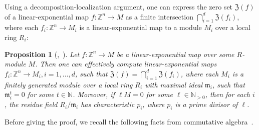 \documentclass[letterpaper, 11pt, thm-restate]{article}
\numberwithin{equation}{section}
\newcommand{\Z}{\mathbb{Z}}
\newcommand{\N}{\mathbb{N}}
\newcommand{\mZ}{\mathfrak{Z}}
\newcommand{\frm}{\mathfrak{m}}
\newtheorem{proposition}[theorem]{Proposition}
\theoremstyle{definition}
\theoremstyle{definition}
\theoremstyle{definition}
\begin{document}
Using a decomposition-localization argument, one can express the zero set $\mZ(f)$ of a linear-exponential map $f \colon \Z^n\rightarrow M$ as a finite intersection $\bigcap_{i = 1}^d \mZ(f_i)$, where each $f_i \colon \Z^n\rightarrow M_i$ is a linear-exponential map to a module $M_i$ over a local ring $R_i$:

\begin{proposition}[{\cite[Section~9]{derksen2007skolem},~\cite[Section~3.2]{dong2025s}}]\label{prop:decompose_localize}
    Let $f \colon \Z^n\rightarrow M$ be a linear-exponential map over some $R$-module $M$.
    Then one can effectively compute linear-exponential maps $f_i:\Z^n\rightarrow M_i, i = 1, \ldots, d$, such that $\mZ(f) = \bigcap_{i = 1}^d \mZ(f_i)$, where each $M_i$ is a finitely generated module over a local ring $R_i$ with maximal ideal $\frm_i$, such that $\frm_i^t = 0$ for some $t \in \N$.
    Moreover, if $\ell M = 0$ for some $\ell \in \N_{>0}$, then for each $i$, the residue field $R_i/\frm_i$ has characteristic $p_i$, where $p_i$ is a prime divisor of $\ell$.
\end{proposition}
\noindent Before giving the proof, we recall the following facts from commutative algebra~\cite{eisenbud2013commutative}.
\end{document}
